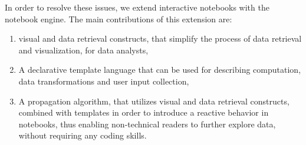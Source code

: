 In order to resolve these issues, we extend interactive notebooks  with the  {\projname} notebook engine. The main contributions of this extension are: 
\begin{enumerate} 
\item visual and data retrieval constructs, that simplify the process of data retrieval and visualization, for data analysts, 
\item A declarative template language that can be used for describing computation, data transformations and user input collection, 
\item A propagation algorithm, that utilizes visual and data retrieval constructs, combined with templates in order to introduce a reactive behavior in notebooks, thus enabling non-technical readers to further explore data, without requiring any coding skills. 
\end{enumerate}


